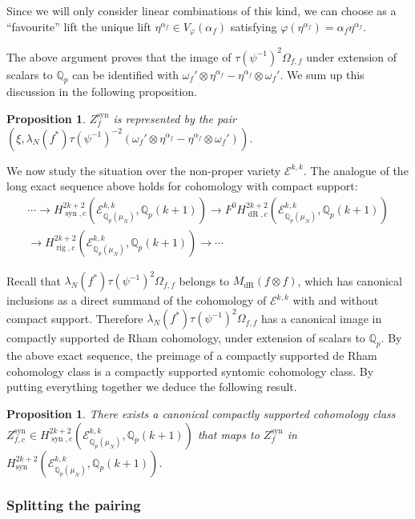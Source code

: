 \documentclass[11pt, a4paper, reqno]{amsart}
\theoremstyle{definition}
\theoremstyle{plain}
\newtheorem{proposition}[definition]{Proposition}
\theoremstyle{remark}
\DeclareMathOperator{\syn}{syn}
\DeclareMathOperator{\rig}{rig}
\DeclareMathOperator{\dR}{dR}
\newcommand{\numberset}{\mathbb}
\newcommand{\Q}{\numberset{Q}}
\renewcommand{\phi}{\varphi}
\newcommand{\Ell}{\mathcal{E}}
\begin{document}
  Since we will only consider linear combinations of this kind, we can choose as a ``favourite'' lift the unique lift $\eta^{\alpha_f} \in V_{\phi}(\alpha_f)$ satisfying $\phi(\eta^{\alpha_f}) = \alpha_f\eta^{\alpha_f}$.

  The above argument proves that the image of $\tau(\psi^{-1})^2\Omega_{f,f}$ under extension of scalars to $\Q_p$ can be identified with $\omega_f'\otimes\eta^{\alpha_f} -\eta^{\alpha_f}\otimes\omega_f'$. We sum up this discussion in the following proposition.

  \begin{proposition}
    \label{prop:pair-representing-syn}
   $Z_f^{\syn}$ is represented by the pair $(\xi, \lambda_N(f^*)\tau(\psi^{-1})^{-2}(\omega_f'\otimes\eta^{\alpha_f} - \eta^{\alpha_f}\otimes\omega_f'))$.
  \end{proposition}

  We now study the situation over the non-proper variety $\Ell^{k,k}$. The analogue of the long exact sequence above holds for cohomology with compact support:
  \begin{multline*}
   \cdots \to H_{\syn,c}^{2k+2}(\Ell^{k,k}_{\Q_p(\mu_N)},\Q_p(k+1)) \to F^0 H_{\dR,c}^{2k+2}(\Ell^{k,k}_{\Q_p(\mu_N)}, \Q_p(k+1)) \\
   \to H_{\rig,c}^{2k+2}(\Ell^{k,k}_{\Q_p(\mu_N)},\Q_p(k+1)) \to \cdots
  \end{multline*}

  Recall that $\lambda_N(f^*)\tau(\psi^{-1})^2\Omega_{f,f}$ belongs to $M_{\dR}(f\otimes f)$, which has canonical inclusions as a direct summand of the cohomology of $\Ell^{k,k}$ with and without compact support. Therefore $\lambda_N(f^*)\tau(\psi^{-1})^2\Omega_{f,f}$ has a canonical image in compactly supported de Rham cohomology, under extension of scalars to $\Q_p$. By the above exact sequence, the preimage of a compactly supported de Rham cohomology class is a compactly supported syntomic cohomology class. By putting everything together we deduce the following result.

  \begin{proposition}
   \label{prop:syntomic-compact-support}
   There exists a canonical compactly supported cohomology class $Z^{\syn}_{f,c} \in H^{2k+2}_{\syn,c}(\Ell^{k,k}_{\Q_p(\mu_N)}, \Q_p(k+1))$ that maps to $Z_f^{\syn}$ in $H^{2k+2}_{\syn}(\Ell^{k,k}_{\Q_p(\mu_N)}, \Q_p(k+1))$.
  \end{proposition}

  \subsubsection*{Splitting the pairing}
\end{document}
